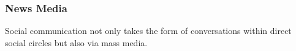 




\subsubsection{News Media}

Social communication not only takes the form of conversations within direct social circles but also via mass media.

